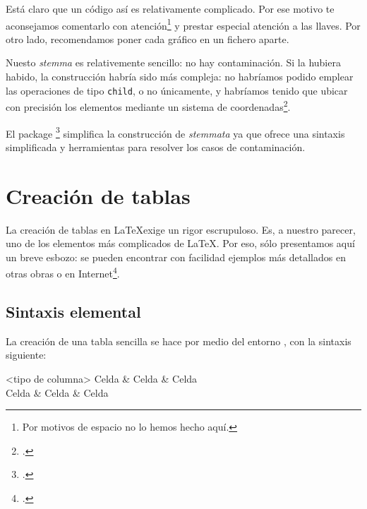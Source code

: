 Está claro que un código así es relativamente complicado. Por ese motivo te aconsejamos comentarlo con atención\footnote{Por motivos de espacio no lo hemos hecho aquí.} y prestar especial atención a las llaves. Por otro lado, recomendamos poner cada gráfico  en un fichero aparte.


Nuesto \emph{stemma} es relativemente sencillo: no hay contaminación. Si la hubiera habido, la construcción habría sido más compleja: no habríamos podido emplear las operaciones de tipo \verb|child|, o no únicamente, y habríamos tenido que ubicar con precisión los elementos mediante un sistema de coordenadas\footcites[Hemos publicado en nuestra página de Internet una serie de artículos sobre los \emph{stemmata} con TikZ:][]{stemma}[resultará provechosa la lectura de un artículo escrito en la lengua de Dante][]{Leal2012a}.

\begin{plusloins}
El package \footcite{tikz-qtree} simplifica la construcción de \emph{stemmata} ya que ofrece una sintaxis simplificada y herramientas para resolver los casos de contaminación.  
\end{plusloins}


\section{Creación de tablas}

\begin{attention}
La creación de tablas en \LaTeX exige un rigor escrupuloso. Es, a nuestro parecer, uno de los elementos más complicados de \LaTeX. Por eso, sólo presentamos aquí un breve esbozo: se pueden encontrar con facilidad ejemplos más detallados en otras obras o en Internet\footcite[Se pueden consultar ficheros bastante didácticos:][]{bebert_tableaux}.
\end{attention}

\subsection{Sintaxis elemental}

La creación de una tabla sencilla se hace por medio del entorno , con la sintaxis siguiente:

\begin{latexcode}
\begin{tabular}{<tipo de columna>}
    Celda & Celda & Celda \\
    Celda & Celda & Celda \\
\end{tabular}
\end{latexcode}


